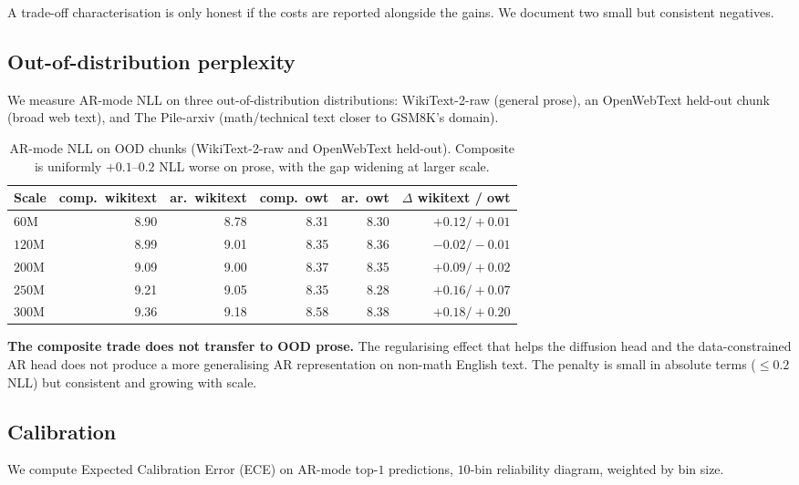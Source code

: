 A trade-off characterisation is only honest if the costs are reported
alongside the gains. We document two small but consistent negatives.

\subsection{Out-of-distribution perplexity}
\label{sec:results-ood}

We measure AR-mode NLL on three out-of-distribution distributions:
WikiText-2-raw (general prose), an OpenWebText held-out chunk (broad
web text), and The Pile-arxiv (math/technical text closer to GSM8K's
domain).

\begin{table}[h]
\centering
\begin{tabular}{lrrrrr}
\toprule
Scale & comp.\ wikitext & ar.\ wikitext & comp.\ owt & ar.\ owt & $\Delta$ wikitext / owt \\
\midrule
$60$M & 8.90 & 8.78 & 8.31 & 8.30 & $+0.12 / +0.01$ \\
$120$M & 8.99 & 9.01 & 8.35 & 8.36 & $-0.02 / -0.01$ \\
$200$M & 9.09 & 9.00 & 8.37 & 8.35 & $+0.09 / +0.02$ \\
$250$M & 9.21 & 9.05 & 8.35 & 8.28 & $+0.16 / +0.07$ \\
$300$M & 9.36 & 9.18 & 8.58 & 8.38 & $+0.18 / +0.20$ \\
\bottomrule
\end{tabular}
\caption{AR-mode NLL on OOD chunks (WikiText-2-raw and OpenWebText
held-out). Composite is uniformly $+0.1$--$0.2$ NLL worse on prose,
with the gap widening at larger scale.}
\label{tab:ood}
\end{table}

\textbf{The composite trade does not transfer to OOD prose.} The
regularising effect that helps the diffusion head and the
data-constrained AR head does not produce a more generalising AR
representation on non-math English text. The penalty is small in
absolute terms ($\le 0.2$ NLL) but consistent and growing with
scale.

\subsection{Calibration}
\label{sec:results-ece}

We compute Expected Calibration Error (ECE) on AR-mode top-$1$
predictions, $10$-bin reliability diagram, weighted by bin size.

